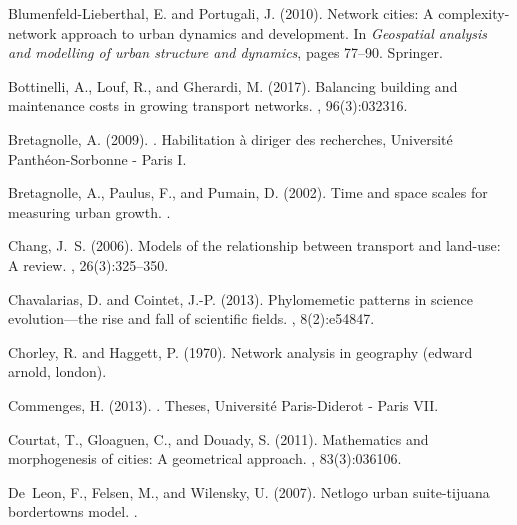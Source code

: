 \documentclass[10pt]{article}
\begin{document}
\begin{thebibliography}{}
Blumenfeld-Lieberthal, E. and Portugali, J. (2010).
\newblock Network cities: A complexity-network approach to urban dynamics and
  development.
\newblock In {\em Geospatial analysis and modelling of urban structure and
  dynamics}, pages 77--90. Springer.

Bottinelli, A., Louf, R., and Gherardi, M. (2017).
\newblock Balancing building and maintenance costs in growing transport
  networks.
, 96(3):032316.

Bretagnolle, A. (2009).
.
\newblock Habilitation {\`a} diriger des recherches, {Universit{\'e}
  Panth{\'e}on-Sorbonne - Paris I}.

Bretagnolle, A., Paulus, F., and Pumain, D. (2002).
\newblock Time and space scales for measuring urban growth.
.

Chang, J.~S. (2006).
\newblock Models of the relationship between transport and land-use: A review.
, 26(3):325--350.

Chavalarias, D. and Cointet, J.-P. (2013).
\newblock Phylomemetic patterns in science evolution—the rise and fall of
  scientific fields.
, 8(2):e54847.

Chorley, R. and Haggett, P. (1970).
\newblock Network analysis in geography (edward arnold, london).

Commenges, H. (2013).
.
\newblock Theses, {Universit{\'e} Paris-Diderot - Paris VII}.

Courtat, T., Gloaguen, C., and Douady, S. (2011).
\newblock Mathematics and morphogenesis of cities: A geometrical approach.
, 83(3):036106.

De~Leon, F., Felsen, M., and Wilensky, U. (2007).
\newblock Netlogo urban suite-tijuana bordertowns model.
.


\end{thebibliography}
\end{document}
